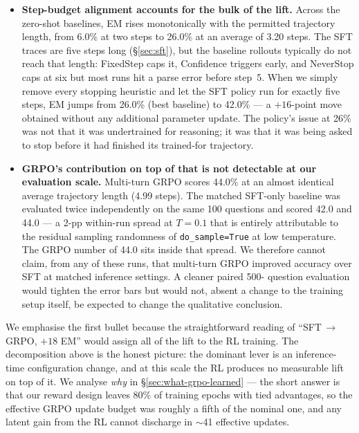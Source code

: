 \documentclass[11pt]{article}
\begin{document}
\begin{itemize}
  \item \textbf{Step-budget alignment accounts for the bulk of the
  lift.} Across the zero-shot baselines, EM rises monotonically with
  the permitted trajectory length, from 6.0\% at two steps to 26.0\%
  at an average of 3.20 steps. The SFT traces are five steps long
  (§\ref{sec:sft}), but the baseline rollouts typically do not reach
  that length: FixedStep caps it, Confidence triggers early, and
  NeverStop caps at six but most runs hit a parse error before
  step~5. When we simply remove every stopping heuristic and let the
  SFT policy run for exactly five steps, EM jumps from 26.0\% (best
  baseline) to 42.0\% --- a $+16$-point move obtained without any
  additional parameter update. The policy's issue at 26\% was not
  that it was undertrained for reasoning; it was that it was being
  asked to stop before it had finished its trained-for trajectory.
  \item \textbf{GRPO's contribution on top of that is not
  detectable at our evaluation scale.} Multi-turn GRPO scores
  44.0\% at an almost identical average trajectory length (4.99
  steps). The matched SFT-only baseline was evaluated twice
  independently on the same 100 questions and scored 42.0 and
  44.0 --- a 2-pp within-run spread at $T{=}0.1$ that is entirely
  attributable to the residual sampling randomness of
  \texttt{do\_sample=True} at low temperature. The GRPO number of
  44.0 sits inside that spread. We therefore cannot claim, from
  any of these runs, that multi-turn GRPO improved accuracy over
  SFT at matched inference settings. A cleaner paired 500-
  question evaluation would tighten the error bars but would not,
  absent a change to the training setup itself, be expected to
  change the qualitative conclusion.
\end{itemize}

We emphasise the first bullet because the straightforward reading of
``SFT$\,\to\,$GRPO, $+18$ EM'' would assign all of the lift to the RL
training. The decomposition above is the honest picture: the
dominant lever is an inference-time configuration change, and at
this scale the RL produces no measurable lift on top of it. We
analyse \emph{why} in §\ref{sec:what-grpo-learned} --- the short
answer is that our reward design leaves 80\% of training epochs
with tied advantages, so the effective GRPO update budget was
roughly a fifth of the nominal one, and any latent gain from the
RL cannot discharge in $\sim$41 effective updates.
\end{document}
